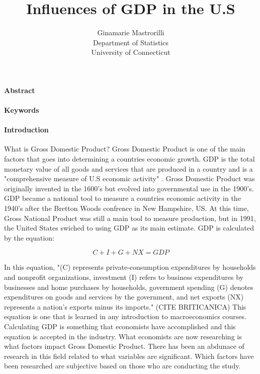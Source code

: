 \documentclass[12pt]{article}
\title{Influences of GDP in the U.S }
\author{Ginamarie Mastrorilli\\
  Department of Statistics\\
  University of Connecticut
}
\begin{document}
\maketitle


\paragraph{Abstract}


\paragraph{Keywords}



\paragraph{Introduction}



  What is Gross Domestic Product? Gross Domestic Product is one of the main factors that goes into determining a countries economic growth. 
GDP is the total monetary value of all goods and services that are produced in a country and is a "comprehensive measure of U.S economic activity" \citet[]{bea}.
Gross Domestic Product was originally invented in the 1600's but evolved into governmental use in the 1900's. 
GDP became a national tool to measure a countries economic activity in the 1940's after the Bretton Woods confrence in New Hampshire, US.
At this time, Gross National Product was still a main tool to measure production, but in 1991, the United States swiched to using GDP as its main estimate. 
GDP is calculated by the equation: 

\begin{equation}
C + I + G + NX = GDP
\end{equation}


In this equation, "(C) represents private-consumption expenditures by households and nonprofit organizations, investment (I) refers to business expenditures by businesses and home purchases by households, 
government spending (G) denotes expenditures on goods and services by the government, and net exports (NX) represents a nation’s exports minus its imports." (CITE BRITICANICA)
This equation is one that is learned in any introduction to macroeconomics courses. 
Calculating GDP is something that economists have accomplished and this equation is accepted in the industry. 
What economists are now researching is what factors impact Gross Domestic Product. 
There has been an abdunace of research in this field related to what variables are significant. 
Which factors have been researched are subjective based on those who are conducting the study.
\end{document}
